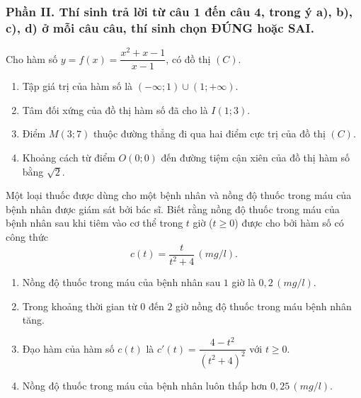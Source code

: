 \subsubsection*{Phần II. Thí sinh trả lời từ câu 1 đến câu 4, trong ý a), b), c), d) ở mỗi câu câu, thí sinh chọn ĐÚNG hoặc SAI.}
\setcounter{bt}{0}

\begin{baitap}
	Cho hàm số $y = f(x) = \dfrac{x^2 + x - 1}{x - 1}$, có đồ thị $(C)$.
	\begin{enumerate}[\quad \bf a)]
		\item Tập giá trị của hàm số là $(-\infty; 1) \cup (1; +\infty)$.
		\item Tâm đối xứng của đồ thị hàm số đã cho là $I(1; 3)$.
		\item Điểm $M(3; 7)$ thuộc đường thẳng đi qua hai điểm cực trị của đồ thị $(C)$.
		\item Khoảng cách từ điểm $O(0; 0)$ đến đường tiệm cận xiên của đồ thị hàm số bằng $\sqrt{2}$.
	\end{enumerate}
\end{baitap}

\begin{baitap}
	Một loại thuốc được dùng cho một bệnh nhân và nồng độ thuốc trong máu của bệnh nhân được giám sát bởi bác sĩ. Biết rằng nồng độ thuốc trong máu của bệnh nhân sau khi tiêm vào cơ thể trong $t$ giờ ($t \ge 0$) được cho bởi hàm số có công thức $$c(t)=\frac{t}{t^2+4}\, (\si{mg/l}).$$
	\begin{enumerate}[\quad \bf a)]
		\item Nồng độ thuốc trong máu của bệnh nhân sau $1$ giờ là $0{,}2\,  (\si{mg/l})$.
		\item Trong khoảng thời gian từ $0$ đến $2$ giờ nồng độ thuốc trong máu bệnh nhân tăng.
		\item Đạo hàm của hàm số $c(t)$ là $c'(t)=\dfrac{4-t^2}{\left(t^2+4\right)^2}$ với $t \ge 0$.
		\item Nồng độ thuốc trong máu của bệnh nhân luôn thấp hơn $0{,}25\,  (\si{mg/l})$.
	\end{enumerate}
\end{baitap}

